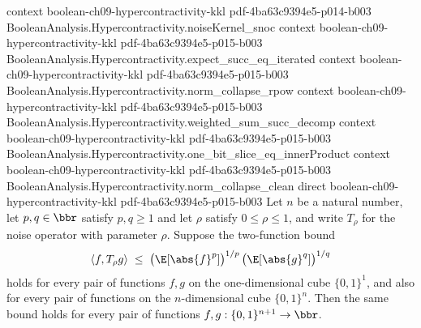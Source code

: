 \begin{lemma}
  {context}
  {boolean-ch09-hypercontractivity-kkl}
  {pdf-4ba63c9394e5-p014-b003}
\proofstep
  {BooleanAnalysis.Hypercontractivity.noiseKernel_snoc}
  {context}
  {boolean-ch09-hypercontractivity-kkl}
  {pdf-4ba63c9394e5-p015-b003}
\proofstep
  {BooleanAnalysis.Hypercontractivity.expect_succ_eq_iterated}
  {context}
  {boolean-ch09-hypercontractivity-kkl}
  {pdf-4ba63c9394e5-p015-b003}
\proofstep
  {BooleanAnalysis.Hypercontractivity.norm_collapse_rpow}
  {context}
  {boolean-ch09-hypercontractivity-kkl}
  {pdf-4ba63c9394e5-p015-b003}
\proofstep
  {BooleanAnalysis.Hypercontractivity.weighted_sum_succ_decomp}
  {context}
  {boolean-ch09-hypercontractivity-kkl}
  {pdf-4ba63c9394e5-p015-b003}
\proofstep
  {BooleanAnalysis.Hypercontractivity.one_bit_slice_eq_innerProduct}
  {context}
  {boolean-ch09-hypercontractivity-kkl}
  {pdf-4ba63c9394e5-p015-b003}
\proofstep
  {BooleanAnalysis.Hypercontractivity.norm_collapse_clean}
  {direct}
  {boolean-ch09-hypercontractivity-kkl}
  {pdf-4ba63c9394e5-p015-b003}
Let $n$ be a natural number, let $p,q\in\bbr$ satisfy $p,q\ge1$ and let $\rho$ satisfy $0 \le \rho \le 1$, and write $T_\rho$ for the
noise operator with parameter $\rho$. Suppose the two-function bound
\[
\langle f, T_\rho g\rangle \;\le\;
\bigl(\E[\abs{f}^p]\bigr)^{1/p}\,\bigl(\E[\abs{g}^q]\bigr)^{1/q}
\]
holds for every pair of functions $f, g$ on the one-dimensional cube $\{0,1\}^1$, and
also for every pair of functions on the $n$-dimensional cube $\{0,1\}^n$. Then the same
bound holds for every pair of functions $f, g : \{0,1\}^{n+1} \to \bbr$.
\end{lemma}

